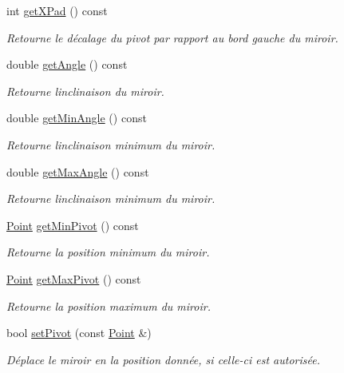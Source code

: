 \begin{DoxyCompactItemize}
int \hyperlink{classMirror_a5f539d8343f70ec68eaee6fd472049ae}{get\+X\+Pad} () const 
\begin{DoxyCompactList}\small\item\em Retourne le décalage du pivot par rapport au bord gauche du miroir. \end{DoxyCompactList}\item 
double \hyperlink{classMirror_a6bdf519d0a2135536c78d38582d277ea}{get\+Angle} () const 
\begin{DoxyCompactList}\small\item\em Retourne l\textquotesingle{}inclinaison du miroir. \end{DoxyCompactList}\item 
double \hyperlink{classMirror_a1aecd262fdf636697e6027da60685bb9}{get\+Min\+Angle} () const 
\begin{DoxyCompactList}\small\item\em Retourne l\textquotesingle{}inclinaison minimum du miroir. \end{DoxyCompactList}\item 
double \hyperlink{classMirror_aedb5e8c9ddad54164921fdf75f4270d9}{get\+Max\+Angle} () const 
\begin{DoxyCompactList}\small\item\em Retourne l\textquotesingle{}inclinaison minimum du miroir. \end{DoxyCompactList}\item 
\hyperlink{classPoint}{Point} \hyperlink{classMirror_a589b4be142b61fcc247ce61bd8ec5d47}{get\+Min\+Pivot} () const 
\begin{DoxyCompactList}\small\item\em Retourne la position minimum du miroir. \end{DoxyCompactList}\item 
\hyperlink{classPoint}{Point} \hyperlink{classMirror_a2b1383e76cc709b4b51f10492d9ed1ad}{get\+Max\+Pivot} () const 
\begin{DoxyCompactList}\small\item\em Retourne la position maximum du miroir. \end{DoxyCompactList}\item 
bool \hyperlink{classMirror_a83f8934245fe330510b031a19fa77fbe}{set\+Pivot} (const \hyperlink{classPoint}{Point} \&)
\begin{DoxyCompactList}\small\item\em Déplace le miroir en la position donnée, si celle-\/ci est autorisée. \end{DoxyCompactList}\item 

\end{DoxyCompactItemize}
